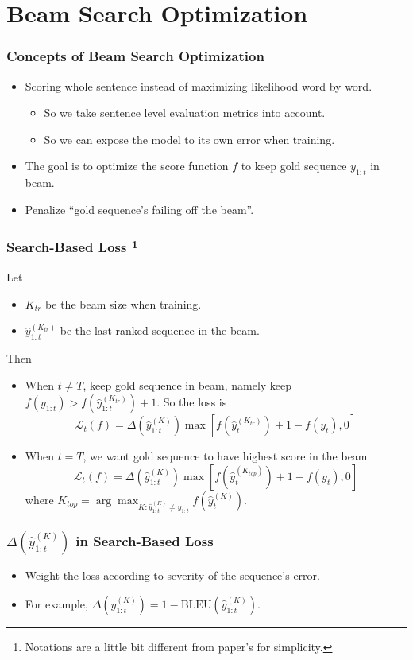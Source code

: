 \section{Beam Search Optimization}


\begin{frame}
  \frametitle{Concepts of Beam Search Optimization}
  \begin{itemize}
  \item Scoring whole sentence instead of maximizing likelihood word by word.
    \begin{itemize}
    \item So we take sentence level evaluation metrics into account.
    \item So we can expose the model to its own error when training.
    \end{itemize}
  \item The goal is to optimize the score function $f$ to keep gold sequence $y_{1:t}$ in beam.
  \item Penalize “gold sequence’s failing off the beam”.
  \end{itemize}
\end{frame}


\begin{frame}
  \frametitle{Search-Based Loss
  \footnote{Notations are a little bit different from paper's for simplicity.}}
  Let
  \begin{itemize}
  \item $K_{tr}$ be the beam size when training.
  \item $\hat{y}^{(K_{tr})}_{1:t}$ be the last ranked sequence in the beam.
  \end{itemize}

  Then
  \begin{itemize}
  \item When $t \ne T$, keep gold sequence in beam, namely keep $f(y_{1:t}) > f(\hat{y}^{(K_{tr})}_{1:t}) + 1$. 
    So the loss is
    $$\mathcal{L}_t(f) = \Delta(\hat{y}_{1:t}^{(K)})\max[f(\hat{y}_t^{(K_{tr})}) + 1 - f(y_t), 0]$$
  \item When $t = T$, we want gold sequence to have highest score in the beam
    $$\mathcal{L}_t(f) = \Delta(\hat{y}_{1:t}^{(K)})\max[f(\hat{y}_t^{(K_{top})}) + 1 - f(y_t), 0]$$
    where $K_{top} = \arg \max_{K: \hat{y}^{(K)}_{1:t} \ne y_{1:t}} f(\hat{y}_t^{(K)})$.
  \end{itemize}
\end{frame}


\begin{frame}
  \frametitle{$\Delta(\hat{y}_{1:t}^{(K)})$ in Search-Based Loss}
  \begin{itemize}
  \item Weight the loss according to severity of the sequence's error.
  \item For example, $\Delta(\hat{y}_{1:t}^{(K)}) = 1 - \mathrm{BLEU}(\hat{y}_{1:t}^{(K)})$.
  \end{itemize}
\end{frame}


